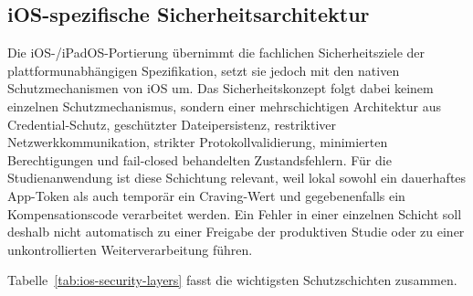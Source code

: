 
\begin{neu}
\section{iOS-spezifische Sicherheitsarchitektur}

Die iOS-/iPadOS-Portierung übernimmt die fachlichen Sicherheitsziele der plattformunabhängigen Spezifikation, setzt sie jedoch mit den nativen Schutzmechanismen von iOS um. Das Sicherheitskonzept folgt dabei keinem einzelnen Schutzmechanismus, sondern einer mehrschichtigen Architektur aus Credential-Schutz, geschützter Dateipersistenz, restriktiver Netzwerkkommunikation, strikter Protokollvalidierung, minimierten Berechtigungen und fail-closed behandelten Zustandsfehlern. Für die Studienanwendung ist diese Schichtung relevant, weil lokal sowohl ein dauerhaftes App-Token als auch temporär ein Craving-Wert und gegebenenfalls ein Kompensationscode verarbeitet werden. Ein Fehler in einer einzelnen Schicht soll deshalb nicht automatisch zu einer Freigabe der produktiven Studie oder zu einer unkontrollierten Weiterverarbeitung führen.

Tabelle~\ref{tab:ios-security-layers} fasst die wichtigsten Schutzschichten zusammen.


\end{neu}
